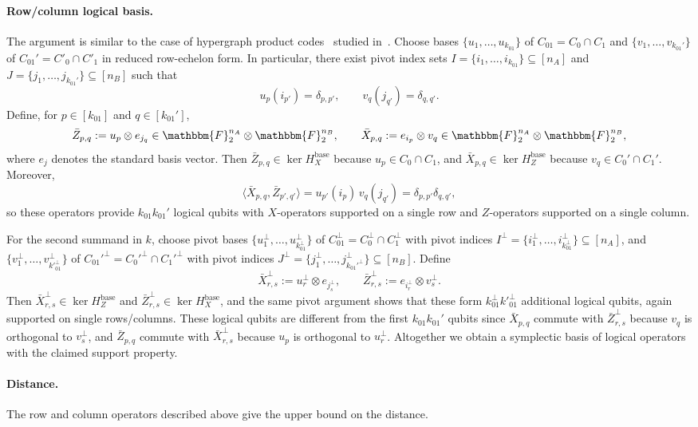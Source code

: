 \documentclass[a4paper,onecolumn,11pt]{quantumarticle}
\def\F{\mathbbm{F}}
\begin{document}
\paragraph{Row/column logical basis.} The argument is similar to the case of hypergraph product codes~\cite{TZ14} studied in~\cite{QWV23}.
Choose bases $\{u_1,\dots,u_{k_{01}}\}$ of $C_{01} = C_0\cap C_1$ and $\{v_1,\dots,v_{k_{01}'}\}$ of $C_{01}' = C'_0 \cap C'_1$ in reduced row-echelon form.
In particular, there exist pivot index sets $I=\{i_1,\dots,i_{k_{01}}\}\subseteq[n_A]$ and $J=\{j_1,\dots,j_{k_{01}'}\}\subseteq[n_B]$ such that
\[
u_p(i_{p'})=\delta_{p,p'},
\qquad
v_q(j_{q'})=\delta_{q,q'}.
\]
Define, for $p\in[k_{01}]$ and $q\in[k_{01}']$,
\[
\bar Z_{p,q} := u_p\otimes e_{j_q}\in \F_2^{n_A}\otimes\F_2^{n_B},
\qquad
\bar X_{p,q} := e_{i_p}\otimes v_q\in \F_2^{n_A}\otimes\F_2^{n_B},
\]
where $e_j$ denotes the standard basis vector.
Then $\bar Z_{p,q}\in \ker H_X^{\mathrm{base}}$ because $u_p\in C_0\cap C_1$, and
$\bar X_{p,q}\in \ker H_Z^{\mathrm{base}}$ because $v_q\in C_0'\cap C_1'$.
Moreover,
\[
\langle \bar X_{p,q}, \bar Z_{p',q'}\rangle
= u_{p'}(i_p)\,v_q(j_{q'})=\delta_{p,p'}\delta_{q,q'},
\]
so these operators provide $k_{01}k_{01}'$ logical qubits with $X$-operators supported on a single row and $Z$-operators supported on a single column.

For the second summand in $k$, choose pivot bases
$\{u_1^\perp,\dots,u_{k_{01}^\perp}^\perp\}$ of $C_{01}^\perp=C_0^\perp\cap C_1^\perp$ with pivot indices $I^\perp=\{i_1^\perp,\dots,i_{k_{01}^\perp}^\perp\}\subseteq[n_A]$, and
$\{v^\perp_1,\dots,v^\perp_{k'^\perp_{01}}\}$ of ${C_{01}'}^\perp={C_0'}^\perp\cap {C_1'}^\perp$ with pivot indices $J^\perp=\{j_1^\perp,\dots,j_{{k_{01}'}^\perp}^\perp\}\subseteq[n_B]$.
Define
\[
\bar X^\perp_{r,s} := u_r^\perp\otimes e_{j_s^\perp},
\qquad
\bar Z^\perp_{r,s} := e_{i_r^\perp}\otimes v^\perp_s.
\]
Then $\bar X^\perp_{r,s}\in\ker H_Z^{\mathrm{base}}$ and $\bar Z^\perp_{r,s}\in\ker H_X^{\mathrm{base}}$, and the same pivot argument shows that these form $k_{01}^\perp k'^\perp_{01}$ additional logical qubits, again supported on single rows/columns. These logical qubits are different from the first $k_{01}k_{01}'$ qubits since $\bar X_{p,q}$ commute with $\bar Z^\perp_{r,s} $ because $v_q$ is orthogonal to $v^\perp_s$, and $\bar Z_{p,q}$ commute with $\bar X^\perp_{r,s}$ because $u_p$ is orthogonal to $u^\perp_r$.
Altogether we obtain a symplectic basis of logical operators with the claimed support property.

\paragraph{Distance.}
The row and column operators described above give the upper bound on the distance.
\end{document}
